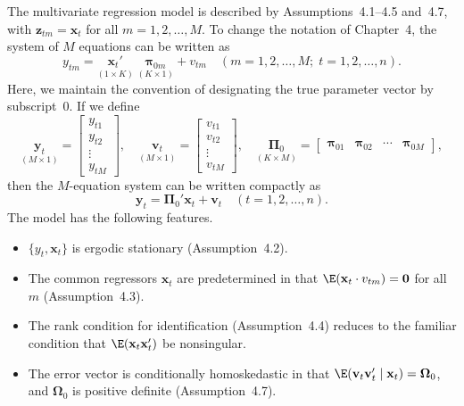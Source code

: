 The multivariate regression model is described by Assumptions~4.1--4.5 and~4.7,
with $\mathbf{z}_{tm} = \mathbf{x}_t$ for all $m = 1, 2, \ldots, M$. To change the notation of Chapter~4,
the system of $M$ equations can be written as
\begin{equation}
  y_{tm} = \underset{(1 \times K)}{\mathbf{x}_t'} \;
  \underset{(K \times 1)}{\boldsymbol{\pi}_{0m}}
  + v_{tm}
  \quad (m = 1, 2, \ldots, M;\; t = 1, 2, \ldots, n).
  \label{eq:8.4.1} \tag{8.4.1}
\end{equation}
Here, we maintain the convention of designating the true parameter vector by subscript~0. If we define
\begin{equation}
  \underset{(M \times 1)}{\mathbf{y}_t}
  = \begin{bmatrix} y_{t1} \\ y_{t2} \\ \vdots \\ y_{tM} \end{bmatrix}, \quad
  \underset{(M \times 1)}{\mathbf{v}_t}
  = \begin{bmatrix} v_{t1} \\ v_{t2} \\ \vdots \\ v_{tM} \end{bmatrix}, \quad
  \underset{(K \times M)}{\boldsymbol{\Pi}_0}
  = \begin{bmatrix}
    \boldsymbol{\pi}_{01} & \boldsymbol{\pi}_{02} & \cdots & \boldsymbol{\pi}_{0M}
  \end{bmatrix},
  \label{eq:8.4.2} \tag{8.4.2}
\end{equation}
then the $M$-equation system can be written compactly as
\begin{equation}
  \mathbf{y}_t = \boldsymbol{\Pi}_0'\mathbf{x}_t + \mathbf{v}_t
  \quad (t = 1, 2, \ldots, n).
  \label{eq:8.4.3} \tag{8.4.3}
\end{equation}
The model has the following features.
\begin{itemize}
\item $\{y_t, \mathbf{x}_t\}$ is ergodic stationary (Assumption~4.2).
\item The common regressors $\mathbf{x}_t$ are predetermined in that
  $\E(\mathbf{x}_t \cdot v_{tm}) = \mathbf{0}$ for all~$m$ (Assumption~4.3).
\item The rank condition for identification (Assumption~4.4) reduces to the familiar
  condition that $\E(\mathbf{x}_t\mathbf{x}_t')$ be nonsingular.
\item The error vector is conditionally homoskedastic in that
  $\E(\mathbf{v}_t\mathbf{v}_t' \mid \mathbf{x}_t) = \boldsymbol{\Omega}_0$, and
  $\boldsymbol{\Omega}_0$ is positive definite (Assumption~4.7).
\end{itemize}

